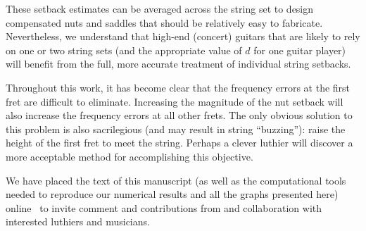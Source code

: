 These setback estimates can be averaged across the string set to design compensated nuts and saddles that should be relatively easy to fabricate. Nevertheless, we understand that high-end (concert) guitars that are likely to rely on one or two string sets (and the appropriate value of $d$ for one guitar player) will benefit from the full, more accurate treatment of individual string setbacks.

Throughout this work, it has become clear that the frequency errors at the first fret are difficult to eliminate. Increasing the magnitude of the nut setback will also increase the frequency errors at all other frets. The only obvious solution to this problem is also sacrilegious (and may result in string ``buzzing''): raise the height of the first fret to meet the string. Perhaps a clever luthier will discover a more acceptable method for accomplishing this objective.

We have placed the text of this manuscript (as well as the computational tools needed to reproduce our numerical results and all the graphs presented here) online~\cite{ref:github2021rgb} to invite comment and contributions from and collaboration with interested luthiers and musicians.